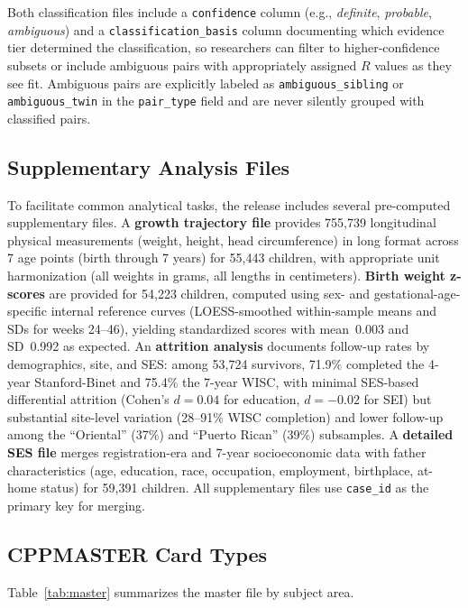 \documentclass[12pt]{article}
\begin{document}
\noindent Both classification files include a \texttt{confidence} column (e.g., \textit{definite}, \textit{probable}, \textit{ambiguous}) and a \texttt{classification\_basis} column documenting which evidence tier determined the classification, so researchers can filter to higher-confidence subsets or include ambiguous pairs with appropriately assigned $R$ values as they see fit. Ambiguous pairs are explicitly labeled as \texttt{ambiguous\_sibling} or \texttt{ambiguous\_twin} in the \texttt{pair\_type} field and are never silently grouped with classified pairs.

\subsection{Supplementary Analysis Files}

To facilitate common analytical tasks, the release includes several pre-computed supplementary files. A \textbf{growth trajectory file} provides 755,739 longitudinal physical measurements (weight, height, head circumference) in long format across 7 age points (birth through 7 years) for 55,443 children, with appropriate unit harmonization (all weights in grams, all lengths in centimeters). \textbf{Birth weight z-scores} are provided for 54,223 children, computed using sex- and gestational-age-specific internal reference curves (LOESS-smoothed within-sample means and SDs for weeks 24--46), yielding standardized scores with mean~0.003 and SD~0.992 as expected. An \textbf{attrition analysis} documents follow-up rates by demographics, site, and SES: among 53,724 survivors, 71.9\% completed the 4-year Stanford-Binet and 75.4\% the 7-year WISC, with minimal SES-based differential attrition (Cohen's $d = 0.04$ for education, $d = -0.02$ for SEI) but substantial site-level variation (28--91\% WISC completion) and lower follow-up among the ``Oriental'' (37\%) and ``Puerto Rican'' (39\%) subsamples. A \textbf{detailed SES file} merges registration-era and 7-year socioeconomic data with father characteristics (age, education, race, occupation, employment, birthplace, at-home status) for 59,391 children. All supplementary files use \texttt{case\_id} as the primary key for merging.

\subsection{CPPMASTER Card Types}

Table~\ref{tab:master} summarizes the master file by subject area.
\end{document}
